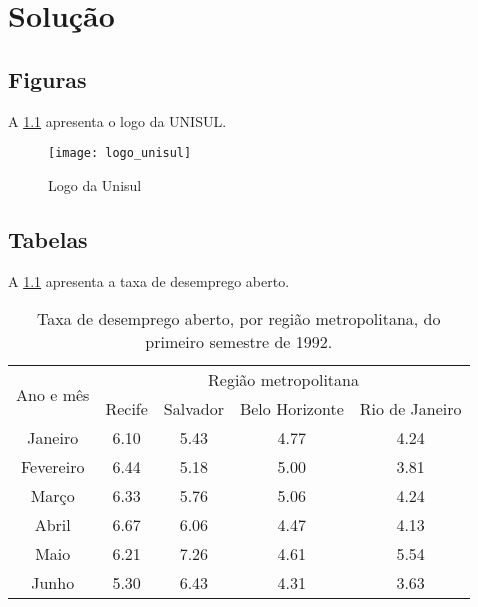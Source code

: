
\chapter{Solução} \label{ch:solucao}

\section{Figuras} \label{sec:figuras}

A \cref{fig:logo-unisul} apresenta o logo da UNISUL.

\begin{figure}[H]
\centering
\caption{Logo da Unisul}
\label{fig:logo-unisul}
\texttt{[image: logo\_unisul]}
\end{figure}

\lipsum[1]

\section{Tabelas} \label{sec:tabelas}

A \cref{tab:taxa-desemprego} apresenta a taxa de desemprego aberto.

\begin{table}[H]
\centering
\caption{Taxa de desemprego aberto, por região metropolitana, do primeiro semestre de 1992.}
\label{tab:taxa-desemprego}
\begin{tabular}{|c|c|c|c|c|}
\hline
\multirow{2}{*}{Ano e mês} & \multicolumn{4}{|c|}{Região metropolitana}          \\ \cline{2-5}
                           & Recife & Salvador & Belo Horizonte & Rio de Janeiro \\ \hline
Janeiro                    & 6.10   & 5.43     & 4.77           & 4.24           \\ \hline
Fevereiro                  & 6.44   & 5.18     & 5.00           & 3.81           \\ \hline
Março                      & 6.33   & 5.76     & 5.06           & 4.24           \\ \hline
Abril                      & 6.67   & 6.06     & 4.47           & 4.13           \\ \hline
Maio                       & 6.21   & 7.26     & 4.61           & 5.54           \\ \hline
Junho                      & 5.30   & 6.43     & 4.31           & 3.63           \\ \hline
\end{tabular}
\end{table}

